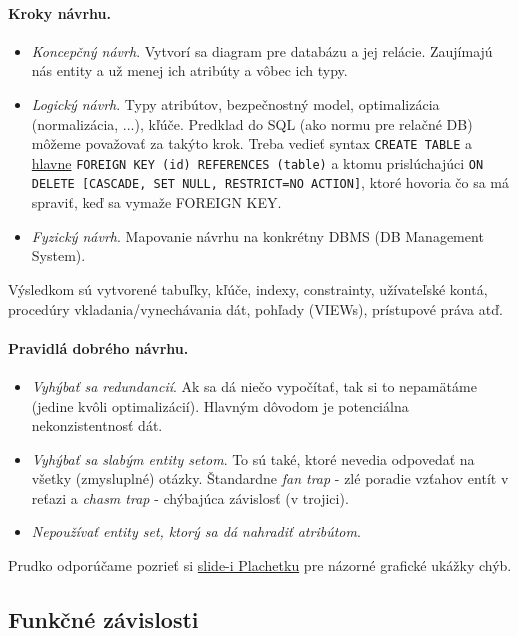 \documentclass[10pt,a4paper]{article}
\begin{document}
\paragraph{Kroky návrhu.}
\begin{itemize}
\item \emph{Koncepčný návrh}. Vytvorí sa diagram pre databázu a jej relácie. Zaujímajú nás entity a už menej ich atribúty a vôbec ich typy. 
\item \emph{Logický návrh}. Typy atribútov, bezpečnostný model, optimalizácia (normalizácia, ...), kľúče. Predklad do SQL (ako normu pre relačné DB) môžeme považovať za takýto krok. Treba vedieť syntax \verb|CREATE TABLE| a \href{http://dev.mysql.com/doc/refman/5.5/en/innodb-foreign-key-constraints.html}{hlavne} \verb|FOREIGN KEY (id) REFERENCES (table)| a ktomu prislúchajúci \verb|ON DELETE [CASCADE, SET NULL, RESTRICT=NO ACTION]|, ktoré hovoria čo sa má spraviť, keď sa vymaže FOREIGN KEY. 
\item \emph{Fyzický návrh}. Mapovanie návrhu na konkrétny DBMS (DB Management System). 
\end{itemize}

Výsledkom sú vytvorené tabuľky, kľúče, indexy, constrainty, užívateľské kontá,
procedúry vkladania/vynechávania dát, pohľady (VIEWs), prístupové práva atď.

\paragraph{Pravidlá dobrého návrhu.}
\begin{itemize}
\item \emph{Vyhýbať sa redundancií}. Ak sa dá niečo vypočítať, tak si to nepamätáme (jedine kvôli optimalizácií). Hlavným dôvodom je potenciálna nekonzistentnosť dát.  
\item \emph{Vyhýbať sa slabým entity setom}. To sú také, ktoré nevedia odpovedať na všetky (zmysluplné) otázky. Štandardne \emph{fan trap} - zlé poradie vzťahov entít v reťazi  a \emph{chasm trap} - chýbajúca závislosť (v trojici).
\item \emph{Nepoužívať entity set, ktorý sa dá nahradiť atribútom}. 
\end{itemize}

Prudko odporúčame pozrieť si \href{http://www.dcs.fmph.uniba.sk/~plachetk/TEACHING/DB2011/db2011_6.pdf}{slide-i Plachetku} pre názorné grafické ukážky chýb. 

\subsection{Funkčné závislosti}
\end{document}
